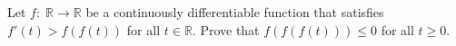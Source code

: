 Let $f:\;\mathbb{R}\to\mathbb{R}$ be a continuously differentiable function that satisfies $f'(t)>f(f(t))$ for all $t\in\mathbb{R}$. Prove that $f(f(f(t)))\le0$ for all $t\ge0$.

